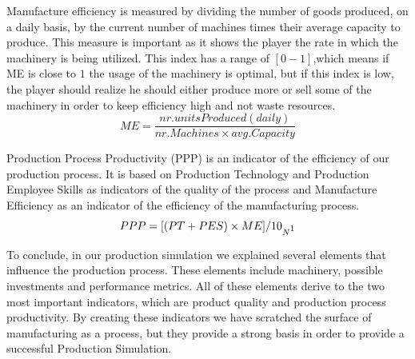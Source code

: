 Manufacture efficiency is measured by dividing the number of goods produced, on a daily basis, by the current number of machines times their average capacity to produce. This measure is important as it shows the player the rate in which the machinery is being utilized. This index has a range of $[0-1]$,which means if ME is close to $1$ the usage of the machinery is optimal, but if this index is low, the player should realize he should either produce more or sell some of the machinery in order to keep efficiency high and not waste resources.
\begin{equation}
ME= \frac{nr. units Produced(daily)}{nr. Machines\times avg. Capacity}  
\label{eq: ME}
\end{equation}

Production Process Productivity (PPP) is an indicator of the efficiency of our production  process. It is based on Production Technology and Production Employee Skills as indicators of the quality of the process and Manufacture Efficiency as an indicator of the efficiency of the manufacturing process.
\begin{equation}
PPP= [(PT + PES) \times ME]/10_{N\footnotemark}
\label{eq:PPP}
\end{equation}
 
To conclude, in our production simulation we explained several elements that influence the production process. These elements include machinery, possible investments and performance metrics. All of these elements derive to the two most important indicators, which are product quality and production process productivity. By creating these indicators we have scratched the surface of manufacturing as a process, but they provide a strong basis in order to provide a successful Production Simulation. 
